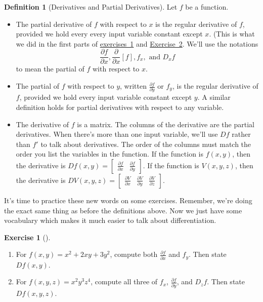 \documentclass[10pt,]{book}
\theoremstyle{plain}
\theoremstyle{definition}
\newtheorem{definition}[theorem]{Definition}
\theoremstyle{definition}
\theoremstyle{definition}
\theoremstyle{definition}
\newtheorem{exploration}[project]{Exercise}
\theoremstyle{definition}
\numberwithin{equation}{section}
\newcommand{\ds}{\displaystyle}
\newcommand{\amp}{&}
\begin{document}
\begin{definition}[{Derivatives and Partial Derivatives}]\label{definition-23}
Let \(f\) be a function. \leavevmode%
\begin{itemize}[label=\textbullet]
\item{}The partial derivative of \(f\) with respect to \(x\) is the regular derivative of \(f\), provided we hold every every input variable constant except \(x\). (This is what we did in the first parts of \hyperref[prob_differential_volume_of_a_cylinder]{exercises~1} and \hyperref[prob_volumebox]{Exercise~2}.  We'll use the notations%
\begin{equation*}
\frac{\partial f}{\partial x}, 
\frac{\partial}{\partial x}[f],
f_x,
\text{ and } D_x f
\end{equation*}
to mean the partial of \(f\) with respect to \(x\).%
\item{}The partial of \(f\) with respect to \(y\), written \(\ds \frac{\partial f}{\partial y}\) or \(f_y\), is the regular derivative of \(f\), provided we hold every input variable constant except \(y\). A similar definition holds for partial derivatives with respect to any variable.%
\item{}The derivative of \(f\) is a matrix. The columns of the derivative are the partial derivatives. When there's more than one input variable, we'll use \(Df\) rather than \(f'\) to talk about derivatives.  The order of the columns must match the order you list the variables in the function. If the function is \(f(x,y)\), then the derivative is \(Df(x,y) = \begin{bmatrix}\frac{\partial f}{\partial x}\amp \frac{\partial f}{\partial y}
\end{bmatrix} .\) If the function is \(V(x,y,z)\), then the derivative is \(DV(x,y,z) = \begin{bmatrix}\frac{\partial V}{\partial x}\amp \frac{\partial V}{\partial y}\amp \frac{\partial V}{\partial z}
\end{bmatrix} .\)%
\end{itemize}
%
\end{definition}
It's time to practice these new words on some exercises. Remember, we're doing the exact same thing as before the definitions above. Now we just have some vocabulary which makes it much easier to talk about differentiation.%
\begin{exploration}[]\label{exploration-135}
\leavevmode%
\begin{enumerate}[font=\bfseries,label=(\alph*),ref=\alph*]
\item\label{task-285} For \(f(x,y)=x^2+2xy+3y^2\), compute both \(\ds\frac{\partial f}{\partial x}\) and \(f_y\). Then state \(Df(x,y)\).%
\item\label{task-286} For \(f(x,y,z)=x^2y^3z^4\), compute all three of \(f_x\), \(\ds\frac{\partial f}{\partial y}\), and \(D_z f\). Then state \(Df(x,y,z)\).%
\end{enumerate}
\end{exploration}
\end{document}

